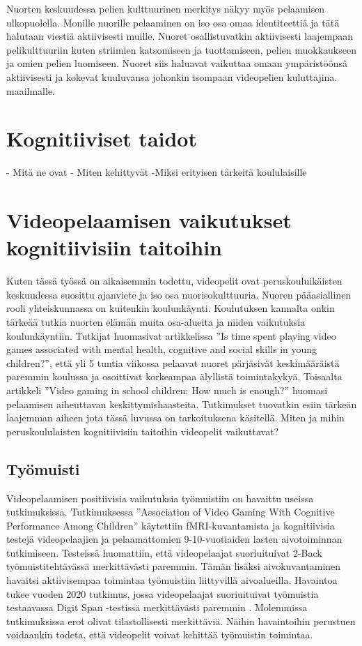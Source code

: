 \documentclass[utf8,bachelor]{gradu3}
\begin{document}
Nuorten keskuudessa pelien kulttuurinen merkitys näkyy myös pelaamisen ulkopuolella. Monille nuorille pelaaminen on iso osa omaa identiteettiä ja tätä halutaan viestiä aktiivisesti muille. Nuoret osallistuvatkin aktiivisesti laajempaan pelikulttuuriin kuten striimien katsomiseen ja tuottamiseen, pelien muokkaukseen ja omien pelien luomiseen. Nuoret siis haluavat vaikuttaa omaan ympäristöönsä aktiivisesti ja kokevat kuuluvansa johonkin isompaan videopelien kuluttajina. maailmalle.\parencite{laakso2023lasten}  

\chapter{Kognitiiviset taidot}
- Mitä ne ovat
- Miten kehittyvät
-Miksi erityisen tärkeitä koululaisille

\chapter{Videopelaamisen vaikutukset kognitiivisiin taitoihin}

Kuten tässä työssä on aikaisemmin todettu, videopelit ovat peruskouluikäisten keskuudessa suosittu ajanviete ja iso osa nuorisokulttuuria. Nuoren pääasiallinen rooli yhteiskunnassa on kuitenkin koulunkäynti. Koulutuksen kannalta onkin tärkeää tutkia nuorten elämän muita osa-alueita ja niiden vaikutuksia koulunkäyntiin. Tutkijat \textcite{kovess2016time} huomasivat artikkelissa ''Is time spent playing video games associated with mental health, cognitive and social skills in young children?'', että yli 5 tuntia viikossa pelaavat nuoret pärjäsivät keskimääräistä paremmin koulussa ja osoittivat korkeampaa älyllistä toimintakykyä. Toisaalta artikkeli ''Video gaming in school children: How much is enough?'' \parencite{pujol2016video} huomasi pelaamisen aiheuttavan keskittymishaasteita. Tutkimukset tuovatkin esiin tärkeän laajemman aiheen jota tässä luvussa on tarkoituksena käsitellä. Miten ja mihin peruskoululaisten kognitiivisiin taitoihin videopelit vaikuttavat? 

\section{Työmuisti}

Videopelaamisen positiivisia vaikutuksia työmuistiin on havaittu useissa tutkimuksissa. Tutkimuksessa ''Association of Video Gaming With Cognitive Performance Among Children'' \parencite{jamanetworkopen} käytettiin fMRI-kuvantamista ja kognitiivisia testejä videopelaajien ja pelaamattomien 9-10-vuotiaiden lasten aivotoiminnan tutkimiseen. Testeissä huomattiin, että videopelaajat suoriuituivat 2-Back työmuistitehtävässä merkittävästi paremmin. Tämän lisäksi aivokuvantaminen havaitsi aktiivisempaa toimintaa työmuistiin liittyvillä aivoalueilla. Havaintoa tukee vuoden 2020 tutkimus, jossa videopelaajat suoriuituivat työmuistia testaavassa Digit Span -testissä merkittävästi paremmin \parencite{choudhury2022cognitive}. Molemmissa tutkimuksissa erot olivat tilastollisesti merkittäviä. Näihin havaintoihin perustuen voidaankin todeta, että videopelit voivat kehittää työmuistin toimintaa. 
\end{document}
